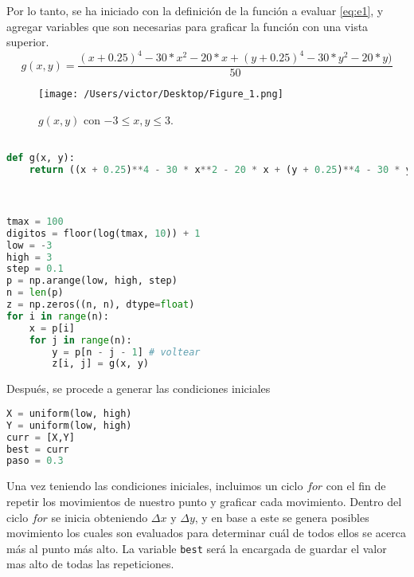 \documentclass{article}
\begin{document}
Por lo tanto, se ha iniciado con la definición de la función a evaluar \ref{eq:e1}, y agregar variables que son necesarias para graficar la función con una vista superior.\\

\begin{equation}
\label{eq:e1}
 g(x,y)= \frac{(x + 0.25)^4 - 30 * x^2 - 20 * x + (y + 0.25)^4 - 30 * y^2 - 20 * y)}{50} 
\end{equation}

\begin{figure}[H]
\begin{center}
	\texttt{[image: /Users/victor/Desktop/Figure\_1.png]}
	\caption{ $g(x,y)$ con $-3\leq x,y \leq 3$.}
	\label{fig:cuadro.1}
\end{center}
\end{figure}

\begin{lstlisting}[language=Python]

def g(x, y):
    return ((x + 0.25)**4 - 30 * x**2 - 20 * x + (y + 0.25)**4 - 30 * y**2 - 20 * y)/50



tmax = 100
digitos = floor(log(tmax, 10)) + 1
low = -3
high = 3
step = 0.1
p = np.arange(low, high, step)
n = len(p)
z = np.zeros((n, n), dtype=float)
for i in range(n):
    x = p[i]
    for j in range(n):
        y = p[n - j - 1] # voltear
        z[i, j] = g(x, y)
 \end{lstlisting}
 
 Después, se procede a generar las condiciones iniciales 

\begin{lstlisting}[language=Python]
X = uniform(low, high)
Y = uniform(low, high)
curr = [X,Y]
best = curr
paso = 0.3
 \end{lstlisting}


Una vez teniendo las condiciones iniciales, incluimos un ciclo $for$ con el fin de repetir los movimientos de nuestro punto y graficar cada movimiento. Dentro del ciclo $for$ se inicia obteniendo $\Delta x$ y $\Delta y$, y en base a este se genera posibles movimiento los cuales son evaluados para determinar cuál de todos ellos se acerca más al punto más alto. La variable \texttt{best} será la encargada de guardar el valor mas alto de todas las repeticiones.
\end{document}
